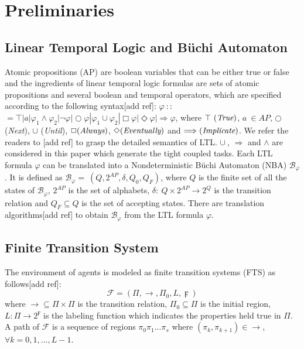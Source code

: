 \documentclass[journal]{IEEEtran}
\begin{document}
\section{Preliminaries}
\subsection{Linear Temporal Logic and B\"{u}chi Automaton}
Atomic propositions (AP) are boolean variables that can be either true or false and the ingredients of linear temporal logic formulas are sets of atomic propositions and several boolean and temporal operators, which are specified according to the following syntax[add ref]: $\varphi\ $$:$$:$$=\top|a|\varphi_1\wedge\varphi_2| \neg \varphi|\bigcirc\varphi|\varphi_1\cup\varphi_2|\Box\varphi|\Diamond\varphi|\Longrightarrow\varphi$, where $\top\ (\emph{True})$, $a\ \in AP$, $\bigcirc$ (\emph{Next}), $\cup$ (\emph{Until}), $\Box (\emph{Always})$,  $\Diamond (\emph{Eventually})$ and $\Longrightarrow (\emph{Implicate})$. We refer the readers to [add ref] to grasp the detailed semantics of LTL. $\cup\ $, $\Longrightarrow$ and $\wedge$ are considered in this paper which generate the tight coupled tasks.
Each LTL formula $\varphi$ can be translated into a Nondeterministic B\"{u}chi Automaton (NBA) $\mathcal{B}_\varphi$. It is defined as $\mathcal{B}_\varphi=\ (Q,2^{AP},\delta,Q_0,Q_F)$, where $Q$ is the finite set of all the states of $\mathcal{B}_\varphi$, $2^{AP}$ is the set of alphabets, $\delta:\ Q\times 2^{AP}\rightarrow 2^Q$ is the transition relation and $Q_F \subseteq Q$ is the set of accepting states. There are translation algorithms[add ref] to obtain $\mathcal{B}_\varphi$ from the LTL formula $\varphi$.
\subsection{Finite Transition System}
The environment of agents is modeled as finite transition systems (FTS) as follows[add ref]:
$$\mathcal{F}=(\Pi,\rightarrow,\Pi_0,L,\digamma)$$
where $\rightarrow \subseteq \Pi \times \Pi$ is the transition relation, $\Pi_0 \subseteq \Pi$ is the initial region, $L:\Pi\rightarrow 2^{\digamma}$ is the labeling function which indicates the properties held true in $\Pi$. A path of $\mathcal{F}$ is a sequence of regions $\pi_0 \pi_1 ...\pi_s$ where $(\pi_k,\pi_{k+1})\in \rightarrow$, $\forall k=0,1,...,L-1$.
\end{document}
